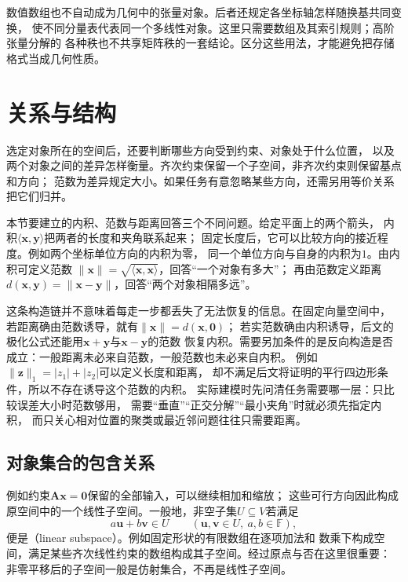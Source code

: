 数值数组也不自动成为几何中的张量对象。后者还规定各坐标轴怎样随换基共同变换，
使不同分量表代表同一个多线性对象。这里只需要数组及其索引规则；高阶张量分解的
各种秩也不共享矩阵秩的一套结论。区分这些用法，才能避免把存储格式当成几何性质。

\section{关系与结构}
\label{sec:linear-algebra-relations}

选定对象所在的空间后，还要判断哪些方向受到约束、对象处于什么位置，
以及两个对象之间的差异怎样衡量。齐次约束保留一个子空间，非齐次约束则保留基点和方向；
范数为差异规定大小。如果任务有意忽略某些方向，还需另用等价关系把它们归并。

本节要建立的内积、范数与距离回答三个不同问题。给定平面上的两个箭头，
内积$\langle\bm x,\bm y\rangle$把两者的长度和夹角联系起来；
固定长度后，它可以比较方向的接近程度。例如两个坐标单位方向的内积为零，
同一个单位方向与自身的内积为$1$。由内积可定义范数
$\lVert\bm x\rVert=\sqrt{\langle\bm x,\bm x\rangle}$，回答“一个对象有多大”；
再由范数定义距离$d(\bm x,\bm y)=\lVert\bm x-\bm y\rVert$，回答“两个对象相隔多远”。

这条构造链并不意味着每走一步都丢失了无法恢复的信息。在固定向量空间中，
若距离确由范数诱导，就有$\lVert\bm x\rVert=d(\bm x,\bm0)$；
若实范数确由内积诱导，后文的极化公式还能用$\bm x+\bm y$与$\bm x-\bm y$的范数
恢复内积。需要另加条件的是反向构造是否成立：一般距离未必来自范数，一般范数也未必来自内积。
例如$\lVert\bm z\rVert_1=|z_1|+|z_2|$可以定义长度和距离，
却不满足后文将证明的平行四边形条件，所以不存在诱导这个范数的内积。
实际建模时先问清任务需要哪一层：只比较误差大小时范数够用，
需要“垂直”“正交分解”“最小夹角”时就必须先指定内积，
而只关心相对位置的聚类或最近邻问题往往只需要距离。

\subsection{对象集合的包含关系}
\label{sec:linear-algebra-subspace-relations}

例如约束$\bm A\bm x=\bm0$保留的全部输入，可以继续相加和缩放；
这些可行方向因此构成原空间中的一个线性子空间。一般地，非空子集$U\subseteq V$若满足
\[
 a\bm u+b\bm v\in U
 \qquad(\bm u,\bm v\in U,\ a,b\in\mathbb F),
\]
便是（linear subspace）。例如固定形状的有限数组在逐项加法和
数乘下构成空间，满足某些齐次线性约束的数组构成其子空间。经过原点与否在这里很重要：
非零平移后的子空间一般是仿射集合，不再是线性子空间。



